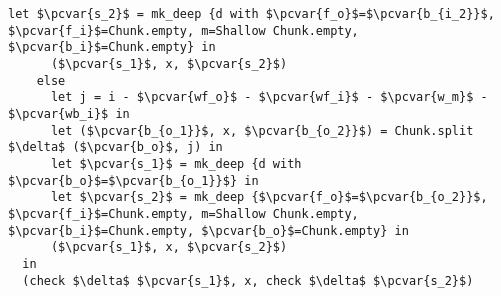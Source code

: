 \documentclass[10pt]{article}
\newcommand{\pcvar}[1]{\mathtt{#1}}
\begin{document}
\begin{lstlisting}[language=pcpp,style=nonumbers]
      let $\pcvar{s_2}$ = mk_deep {d with $\pcvar{f_o}$=$\pcvar{b_{i_2}}$, $\pcvar{f_i}$=Chunk.empty, m=Shallow Chunk.empty, $\pcvar{b_i}$=Chunk.empty} in
      ($\pcvar{s_1}$, x, $\pcvar{s_2}$)
    else
      let j = i - $\pcvar{wf_o}$ - $\pcvar{wf_i}$ - $\pcvar{w_m}$ - $\pcvar{wb_i}$ in
      let ($\pcvar{b_{o_1}}$, x, $\pcvar{b_{o_2}}$) = Chunk.split $\delta$ ($\pcvar{b_o}$, j) in
      let $\pcvar{s_1}$ = mk_deep {d with $\pcvar{b_o}$=$\pcvar{b_{o_1}}$} in
      let $\pcvar{s_2}$ = mk_deep {$\pcvar{f_o}$=$\pcvar{b_{o_2}}$, $\pcvar{f_i}$=Chunk.empty, m=Shallow Chunk.empty, $\pcvar{b_i}$=Chunk.empty, $\pcvar{b_o}$=Chunk.empty} in
      ($\pcvar{s_1}$, x, $\pcvar{s_2}$)
  in
  (check $\delta$ $\pcvar{s_1}$, x, check $\delta$ $\pcvar{s_2}$)
\end{lstlisting}



\end{document}
